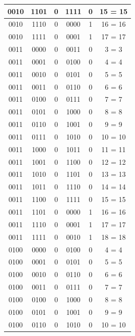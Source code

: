 \documentclass{exam}
\begin{document}
\begin{center}
\begin{longtable}{|c|c|c|c|c|c|}
                0010 & 1101 & 0 & 1111 & 0 & 15 = 15 \\ \hline
                0010 & 1110 & 0 & 0000 & 1 & 16 = 16 \\ \hline
                0010 & 1111 & 0 & 0001 & 1 & 17 = 17 \\ \hline
                0011 & 0000 & 0 & 0011 & 0 & 3 = 3 \\ \hline
                0011 & 0001 & 0 & 0100 & 0 & 4 = 4 \\ \hline
                0011 & 0010 & 0 & 0101 & 0 & 5 = 5 \\ \hline
                0011 & 0011 & 0 & 0110 & 0 & 6 = 6 \\ \hline
                0011 & 0100 & 0 & 0111 & 0 & 7 = 7 \\ \hline
                0011 & 0101 & 0 & 1000 & 0 & 8 = 8 \\ \hline
                0011 & 0110 & 0 & 1001 & 0 & 9 = 9 \\ \hline
                0011 & 0111 & 0 & 1010 & 0 & 10 = 10 \\ \hline
                0011 & 1000 & 0 & 1011 & 0 & 11 = 11 \\ \hline
                0011 & 1001 & 0 & 1100 & 0 & 12 = 12 \\ \hline
                0011 & 1010 & 0 & 1101 & 0 & 13 = 13 \\ \hline
                0011 & 1011 & 0 & 1110 & 0 & 14 = 14 \\ \hline
                0011 & 1100 & 0 & 1111 & 0 & 15 = 15 \\ \hline
                0011 & 1101 & 0 & 0000 & 1 & 16 = 16 \\ \hline
                0011 & 1110 & 0 & 0001 & 1 & 17 = 17 \\ \hline
                0011 & 1111 & 0 & 0010 & 1 & 18 = 18 \\ \hline
                0100 & 0000 & 0 & 0100 & 0 & 4 = 4 \\ \hline
                0100 & 0001 & 0 & 0101 & 0 & 5 = 5 \\ \hline
                0100 & 0010 & 0 & 0110 & 0 & 6 = 6 \\ \hline
                0100 & 0011 & 0 & 0111 & 0 & 7 = 7 \\ \hline
                0100 & 0100 & 0 & 1000 & 0 & 8 = 8 \\ \hline
                0100 & 0101 & 0 & 1001 & 0 & 9 = 9 \\ \hline
                0100 & 0110 & 0 & 1010 & 0 & 10 = 10 \\ \hline

\end{longtable}
\end{center}
\end{document}

